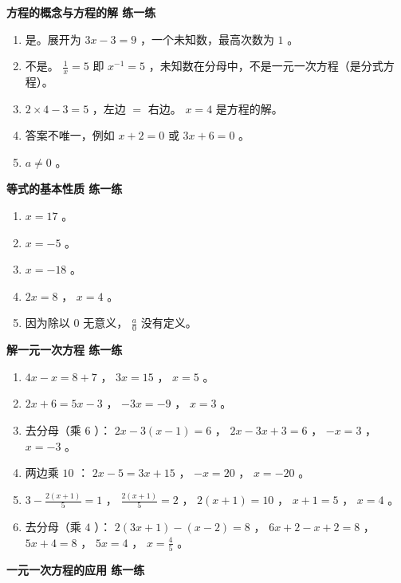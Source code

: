 \begin{answer}


\textbf{方程的概念与方程的解 练一练}

\begin{enumerate}
  \item 是。展开为 $3x - 3 = 9$ ，一个未知数，最高次数为 $1$ 。
  \item 不是。 $\frac{1}{x} = 5$ 即 $x^{-1} = 5$ ，未知数在分母中，不是一元一次方程（是分式方程）。
  \item $2 \times 4 - 3 = 5$ ，左边 $=$ 右边。 $x = 4$ 是方程的解。
  \item 答案不唯一，例如 $x + 2 = 0$ 或 $3x + 6 = 0$ 。
  \item $a \neq 0$ 。
\end{enumerate}


\textbf{等式的基本性质 练一练}

\begin{enumerate}
  \item $x = 17$ 。
  \item $x = -5$ 。
  \item $x = -18$ 。
  \item $2x = 8$ ， $x = 4$ 。
  \item 因为除以 $0$ 无意义， $\frac{a}{0}$ 没有定义。
\end{enumerate}


\textbf{解一元一次方程 练一练}

\begin{enumerate}
  \item $4x - x = 8 + 7$ ， $3x = 15$ ， $x = 5$ 。
  \item $2x + 6 = 5x - 3$ ， $-3x = -9$ ， $x = 3$ 。
  \item 去分母（乘 $6$ ）： $2x - 3(x-1) = 6$ ， $2x - 3x + 3 = 6$ ， $-x = 3$ ， $x = -3$ 。
  \item 两边乘 $10$ ： $2x - 5 = 3x + 15$ ， $-x = 20$ ， $x = -20$ 。
  \item $3 - \frac{2(x+1)}{5} = 1$ ， $\frac{2(x+1)}{5} = 2$ ， $2(x+1) = 10$ ， $x + 1 = 5$ ， $x = 4$ 。
  \item 去分母（乘 $4$ ）： $2(3x+1) - (x-2) = 8$ ， $6x + 2 - x + 2 = 8$ ， $5x + 4 = 8$ ， $5x = 4$ ， $x = \frac{4}{5}$ 。
\end{enumerate}


\textbf{一元一次方程的应用 练一练}


\end{answer}
